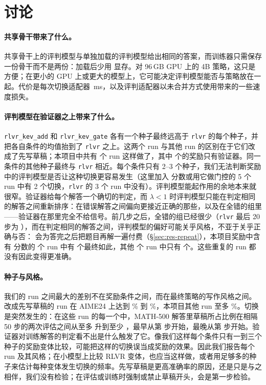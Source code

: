 
\section{讨论}\label{sec:discussion}

\paragraph{共享骨干带来了什么。} 共享骨干上的评判模型与单独加载的评判模型给出相同的答案，而训练器只需保存一份骨干而不是两份：加载后少用  显存。对 96\,GB GPU 上的 4B 策略，这只是方便；在更小的 GPU 上或更大的模型上，它可能决定评判模型能否与策略放在一起。代价是每次切换适配器 \,ms，以及评判适配器以未合并方式使用带来的一些速度损失。

\paragraph{评判模型在验证器之上带来了什么。} \texttt{rlvr\_kev\_add} 和 \texttt{rlvr\_kev\_gate} 各有一个种子最终远高于 \texttt{rlvr} 的每个种子，并把各自条件的均值抬到了 \texttt{rlvr} 之上。这两个 run 与其他 run 的区别在于它们改成了先写草稿；本项目中共有  个 run 这样做了，其中  个的奖励只有验证器。同一条件的其他种子最终与 \texttt{rlvr} 相近。每个条件只有 2--3 个种子，我们无法判断奖励中的评判模型是否让这种切换更容易发生（这里加入 \kev{} 分数或用它做门控的 5 个 run 中有 2 个切换，\texttt{rlvr} 的 3 个 run 中没有）。评判模型能起作用的余地本来就很窄。验证器给每个解答一个确切的判定，而 $\lambda<1$ 时评判模型只能在判定相同的解答之间重新排序：在错误解答之间偏向更接近正确的那些，以及在全错的组里——验证器在那里完全不给信号。前几步之后，全错的组已经很少（\texttt{rlvr} 最后 20 步为 ），而在判定相同的解答之间，评判模型的偏好可能关乎风格，不亚于关乎正确与否：\kev{} 会为答完之后把题目再解一遍付费（\S\ref{sec:res-repeat}），本项目奖励中含有 \kev{} 分数的  个 run 中有  个最终如此，其他  个 run 中只有  个。这些重复的 run 都没有因此变得更准确。

\paragraph{种子与风格。} 我们的 run 之间最大的差别不在奖励条件之间，而在最终策略的写作风格之间。改成先写草稿的 run 在 AIME24 上达到 \% 到 \%，本项目其他 run 至多 \%。切换是突然发生的：在这些 run 的每一个中，MATH-500 解答里草稿所占比例在相隔 50 步的两次评估之间从至多  升到至少 ，最早从第  步开始，最晚从第  步开始。验证器对训练解答的判定看不出是什么触发了它。像我们这样每个条件只有一到三个种子的奖励变体比较，可能把这样的切换误当成奖励的效果。因此我们报告每个 run 及其风格；在小模型上比较 RLVR 变体，也应当这样做，或者用足够多的种子来估计每种变体发生切换的频率。先写草稿是更高准确率的原因，还是只是与之相伴，我们没有检验；在评估或训练时强制或禁止草稿开头，会是第一步检验。

